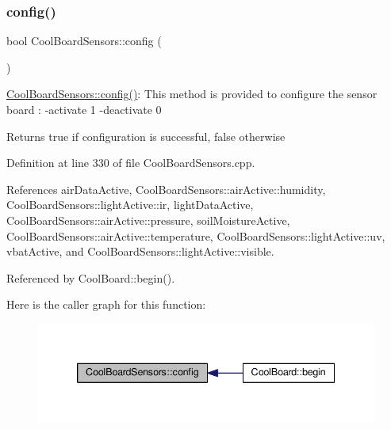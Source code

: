 \subsubsection{\texorpdfstring{config()}{config()}}
{\footnotesize\ttfamily bool Cool\+Board\+Sensors\+::config (\begin{DoxyParamCaption}{ }\end{DoxyParamCaption})}

\hyperlink{class_cool_board_sensors_a9a218895c5423375c33c08f2c56fb23a}{Cool\+Board\+Sensors\+::config()}\+: This method is provided to configure the sensor board \+: -\/activate 1 -\/deactivate 0

\begin{DoxyReturn}{Returns}
true if configuration is successful, false otherwise 
\end{DoxyReturn}


Definition at line 330 of file Cool\+Board\+Sensors.\+cpp.



References air\+Data\+Active, Cool\+Board\+Sensors\+::air\+Active\+::humidity, Cool\+Board\+Sensors\+::light\+Active\+::ir, light\+Data\+Active, Cool\+Board\+Sensors\+::air\+Active\+::pressure, soil\+Moisture\+Active, Cool\+Board\+Sensors\+::air\+Active\+::temperature, Cool\+Board\+Sensors\+::light\+Active\+::uv, vbat\+Active, and Cool\+Board\+Sensors\+::light\+Active\+::visible.



Referenced by Cool\+Board\+::begin().

Here is the caller graph for this function\+:
\nopagebreak
\begin{figure}[H]
\begin{center}
\leavevmode
\includegraphics[width=339pt]{de/d46/class_cool_board_sensors_a9a218895c5423375c33c08f2c56fb23a_icgraph}
\end{center}
\end{figure}
\mbox{\label{class_cool_board_sensors_af6fd79505815b204c178617ecf54c873}} 
